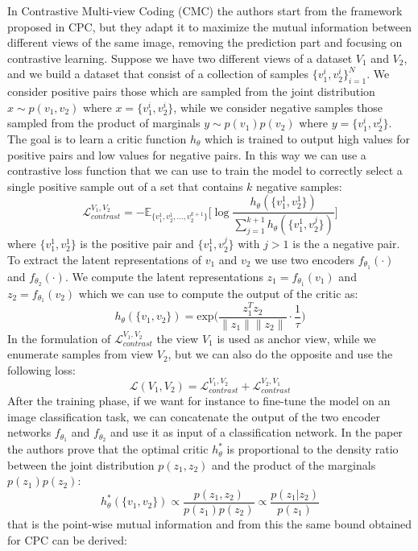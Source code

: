In Contrastive Multi-view Coding (CMC) \cite{tian2020contrastive} the authors start from the framework proposed in CPC, but they adapt it to maximize the mutual information between different views of the same image, removing the prediction part and focusing on contrastive learning. Suppose we have two different views of a dataset $V_1$ and $V_2$, and we build a dataset that consist of a collection of samples $\{v_1^i, v_2^i\}_{i=1}^N$. We consider positive pairs those which are sampled from the joint distribution $x \sim p(v_1, v_2)$ where $x= \{v_1^i, v_2^i\}$, while we consider negative samples those sampled from the product of marginals $y \sim p(v_1)p(v_2)$ where $y = \{v_1^i, v_2^j\}$. The goal is to learn a critic function $h_\theta$ which is trained to output high values for positive pairs and low values for negative pairs. In this way we can use a contrastive loss function that we can use to train the model to correctly select a single positive sample out of a set that contains $k$ negative samples:
\[\mathcal{L}^{V_1, V_2}_{contrast} = -\mathbb{E}_{\{v_1^1, v_2^1, \dots, v_2^{k+1}\}} \Bigg[ \log \frac{h_\theta(\{v_1^1, v_2^1 \})}{\sum_{j=1}^{k+1}h_\theta(\{v_1^1, v_2^j \})}  \Bigg] \]
where $\{v_1^1, v_2^1 \}$ is the positive pair and $\{v_1^1, v_2^j \}$ with $j > 1$ is the a negative pair. To extract the latent representations of $v_1$ and $v_2$ we use two encoders $f_{\theta_1}(\cdot)$ and $f_{\theta_2}(\cdot)$. We compute the latent representations $z_1 = f_{\theta_1}(v_1)$ and $z_2 = f_{\theta_1}(v_2)$ which we can use to compute the output of the critic as:
\[ h_\theta(\{v_1, v_2\}) = \text{exp}\Bigg(\frac{z_1^Tz_2}{\lVert z_1\rVert \lVert z_2\rVert}\cdot \frac{1}{\tau}\Bigg) \]
In the formulation of $\mathcal{L}^{V_1, V_2}_{contrast}$ the view $V_1$ is used as anchor view, while we enumerate samples from view $V_2$, but we can also do the opposite and use the following loss:
\[ \mathcal{L}(V_1, V_2) = \mathcal{L}^{V_1, V_2}_{contrast} + \mathcal{L}^{V_2, V_1}_{contrast} \]
After the training phase, if we want for instance to fine-tune the model on an image classification task, we can concatenate the output of the two encoder networks $f_{\theta_1}$ and $f_{\theta_2}$ and use it as input of a classification network.
In the paper the authors prove that the optimal critic $h^*_\theta$ is proportional to the density ratio between the joint distribution $p(z_1, z_2)$ and the product of the marginals $p(z_1)p(z_2)$:
\[ h^*_\theta(\{ v_1,v_2\}) \propto \frac{p(z_1, z_2)}{p(z_1)p(z_2)} \propto \frac{p(z_1|z_2)}{p(z_1)} \]
that is the point-wise mutual information and from this the same bound obtained for CPC can be derived:
